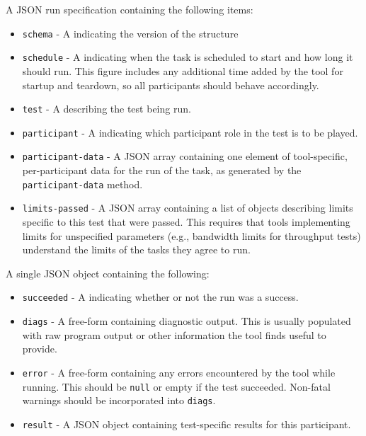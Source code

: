 \documentclass[10pt,titlepage]{article}
\begin{document}
 A JSON run specification containing the following items:
\begin{itemize}

\item{\tt schema} - A  indicating the version of the structure

\item{\tt schedule} - A  indicating when the
  task is scheduled to start and how long it should run.  This figure
  includes any additional time added by the tool for startup and
  teardown, so all participants should behave accordingly.

\item{\tt test} - A  describing the test
  being run.

\item{\tt participant} - A  indicating which
  participant role in the test is to be played.

\item{\tt participant-data} - A JSON array containing one element of
  tool-specific, per-participant data for the run of the task, as
  generated by the {\tt participant-data} method.

\item{\tt limits-passed} - A JSON array containing a list of objects
  describing limits specific to this test that were passed.  This
  requires that tools implementing limits for unspecified parameters
  (e.g., bandwidth limits for throughput tests) understand the limits
  of the tasks they agree to run.


\end{itemize}

 A single JSON object containing the following:

\begin{itemize}
\item{\tt succeeded} - A  indicating whether or not
  the run was a success.

\item{\tt diags} - A free-form  containing diagnostic
  output.  This is usually populated with raw program output or other
  information the tool finds useful to provide.

\item{\tt error} - A free-form  containing any errors
  encountered by the tool while running.  This should be {\tt null} or
  empty if the test succeeded.  Non-fatal warnings should be
  incorporated into {\tt diags}.

\item{\tt result} - A JSON object containing test-specific results for
  this participant.

\end{itemize}
\end{document}
